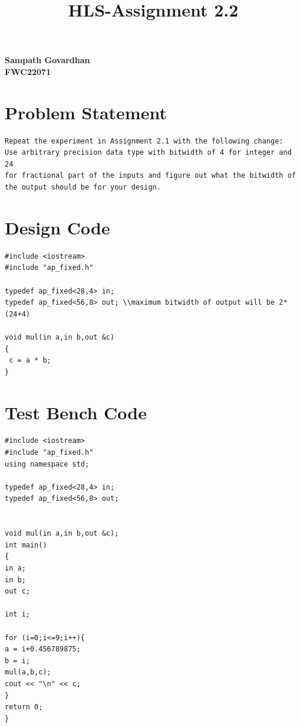 \documentclass{article}
\title{
HLS-Assignment 2.2
}
\begin{document}
\maketitle
\hfill \textbf{Sampath Govardhan} \\
\null \hfill \textbf{FWC22071}\\
\tableofcontents
\section{Problem Statement}
\begin{lstlisting}
Repeat the experiment in Assignment 2.1 with the following change:
Use arbitrary precision data type with bitwidth of 4 for integer and 24 
for fractional part of the inputs and figure out what the bitwidth of 
the output should be for your design.
\end{lstlisting}
\vspace{10cm}


\section{Design Code}
\begin{lstlisting}
#include <iostream>
#include "ap_fixed.h"

typedef ap_fixed<28,4> in;
typedef ap_fixed<56,8> out; \\maximum bitwidth of output will be 2*(24+4)

void mul(in a,in b,out &c)
{
 c = a * b;
}

\end{lstlisting}
\vspace{5cm}


\section{Test Bench Code}
\begin{lstlisting}
#include <iostream>
#include "ap_fixed.h"
using namespace std;

typedef ap_fixed<28,4> in;
typedef ap_fixed<56,8> out;


void mul(in a,in b,out &c);
int main()
{
in a;
in b;
out c;

int i;

for (i=0;i<=9;i++){
a = i+0.456789875;
b = i;
mul(a,b,c);
cout << "\n" << c;
}
return 0;
}


\end{lstlisting}
\vspace{5cm}
\end{document}
